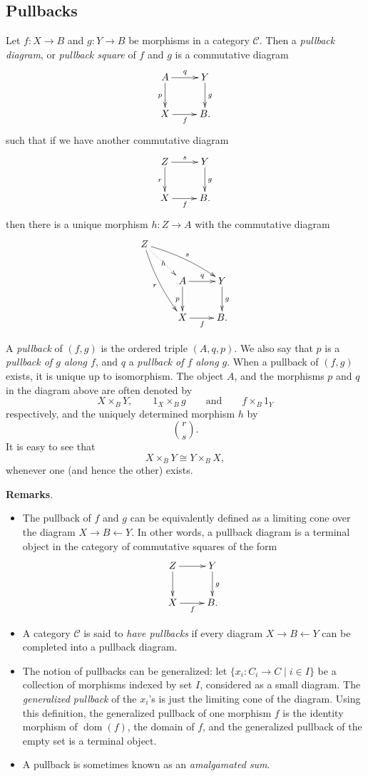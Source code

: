 \documentclass[12pt]{article}
\newcommand{\from}{\leftarrow}
\begin{document}

\subsection*{Pullbacks}

Let $f:X\to B$ and $g:Y\to B$ be morphisms in a category $\mathcal{C}$.  Then a \emph{pullback diagram}, or \emph{pullback square} of $f$ and $g$ is a commutative diagram
\[\xymatrix{
A\ar[d]_p \ar[r]^q & Y\ar[d]^g \\
X\ar[r]_f       & B.
}\]
such that if we have another commutative diagram
\[\xymatrix{
Z\ar[d]_r\ar[r]^s & Y\ar[d]^g \\
X\ar[r]_f       & B.
}\]
then there is a unique morphism $h:Z\to A$ with the commutative diagram
\[\xymatrix{
Z\ar@/^1ex/[rrd]^s \ar@/_1ex/[rdd]_r \ar@{.>}[rd]|h & & \\
  & A\ar[d]_p\ar[r]^q & Y\ar[d]^g \\
  & X\ar[r]_f                 & B.
}\]

A \emph{pullback} of $(f,g)$ is the ordered triple $(A,q,p)$.  We also say that $p$ is a \emph{pullback of $g$ along $f$}, and $q$ a \emph{pullback of $f$ along $g$}.  When a pullback of $(f,g)$ exists, it is unique up to isomorphism.  The object $A$, and the morphisms $p$ and $q$ in the diagram above are often denoted by $$X\times_B Y,\qquad 1_X \times_B g\qquad \mbox{and} \qquad f\times_B 1_Y$$ respectively, and the uniquely determined morphism $h$ by $$\displaystyle{r \choose s}.$$  It is easy to see that $$X\times_B Y\cong Y\times_B X,$$ whenever one (and hence the other) exists.

\textbf{Remarks}.  
\begin{itemize}
\item
The pullback of $f$ and $g$ can be equivalently defined as a limiting cone over the diagram $X\to B\from Y$.  In other words, a pullback diagram is a terminal object in the category of commutative squares of the form 
\[\xymatrix{
Z\ar[d] \ar[r] & Y\ar[d]^g \\
X\ar[r]_f       & B.
}\]
\item A category $\mathcal{C}$ is said to \emph{have pullbacks} if every diagram $X \to B \from Y$ can be completed into a pullback diagram.
\item
The notion of pullbacks can be generalized: let $\lbrace x_i: C_i \to C \mid i\in I\rbrace$ be a collection of morphisms indexed by set $I$, considered as a small diagram.  The \emph{generalized pullback} of the $x_i$'s is just the limiting cone of the diagram.  Using this definition, the generalized pullback of one morphism $f$ is the identity morphism of $\operatorname{dom}(f)$, the domain of $f$, and the generalized pullback of the empty set is a terminal object.
\item A pullback is sometimes known as an \emph{amalgamated sum}.
\end{itemize}
\end{document}
